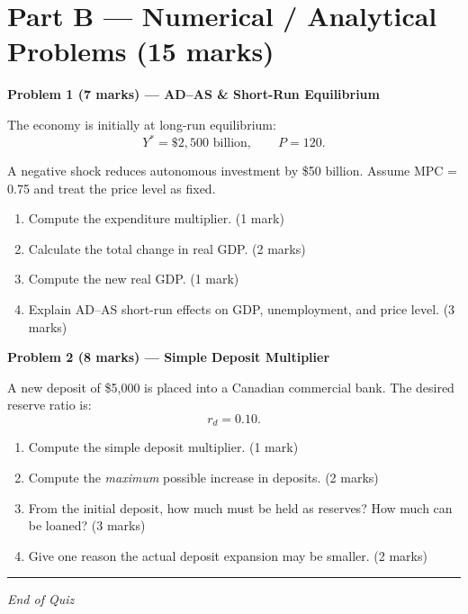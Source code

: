 \documentclass[12pt]{article}
\begin{document}
\vspace{1em}

\section*{Part B — Numerical / Analytical Problems (15 marks)}

\textbf{Problem 1 (7 marks) — AD--AS \& Short-Run Equilibrium}

The economy is initially at long-run equilibrium:
\[
Y^* = \$2{,}500 \text{ billion}, \qquad P = 120.
\]

A negative shock reduces autonomous investment by \$50 billion.  
Assume MPC = 0.75 and treat the price level as fixed.

\begin{enumerate}
    \item[(a)] Compute the expenditure multiplier. (1 mark)
    \item[(b)] Calculate the total change in real GDP. (2 marks)
    \item[(c)] Compute the new real GDP. (1 mark)
    \item[(d)] Explain AD--AS short-run effects on GDP, unemployment, and price level. (3 marks)
\end{enumerate}


\vspace{5em}

\textbf{Problem 2 (8 marks) — Simple Deposit Multiplier}

A new deposit of \$5,000 is placed into a Canadian commercial bank.  
The desired reserve ratio is:
\[
r_d = 0.10.
\]

\begin{enumerate}
    \item[(a)] Compute the simple deposit multiplier. (1 mark)
    \item[(b)] Compute the \textit{maximum} possible increase in deposits. (2 marks)
    \item[(c)] From the initial deposit, how much must be held as reserves? How much can be loaned? (3 marks)
    \item[(d)] Give one reason the actual deposit expansion may be smaller. (2 marks)
\end{enumerate}

\hrule
\vspace{1em}

\begin{center}
\textit{End of Quiz}
\end{center}
\end{document}
